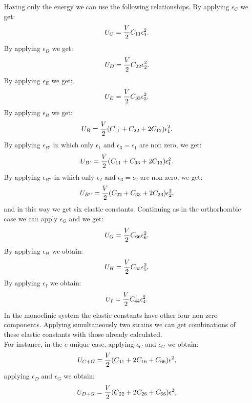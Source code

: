 \documentclass[12pt,a4paper]{article}
\begin{document}
Having only the energy we can use the following
relationships. By applying $\epsilon_C$ we get:
\begin{equation}
U_C= {V \over 2} C_{11} \epsilon_1^2.
\end{equation}
By applying $\epsilon_D$ we get:
\begin{equation}
U_D= {V \over 2} C_{22} \epsilon_2^2.
\end{equation}
By applying $\epsilon_E$ we get:
\begin{equation}
U_E= {V \over 2} C_{33} \epsilon_3^2.
\end{equation}
By applying $\epsilon_B$ we get:
\begin{equation}
U_B= {V \over 2} (C_{11} + C_{22} + 2 C_{12}) \epsilon_1^2.
\end{equation}
By applying $\epsilon_{B'}$ in which only $\epsilon_1$ and
$\epsilon_3=\epsilon_1$ are non zero, we get:
\begin{equation}
U_{B'}= {V \over 2} (C_{11} + C_{33} + 2 C_{13}) \epsilon_1^2.
\end{equation}
By applying $\epsilon_{B''}$ in which only $\epsilon_2$ and
$\epsilon_3=\epsilon_2$ are non zero, we get:
\begin{equation}
U_{B''}= {V \over 2} (C_{22} + C_{33} + 2 C_{23}) \epsilon_2^2,
\end{equation}
and in this way we get six elastic constants. Continuing as in the
orthorhombic case we can
apply $\epsilon_G$ and we get:
\begin{equation}
U_G= {V \over 2} C_{66} \epsilon_6^2.
\end{equation}
By applying $\epsilon_H$ we obtain:
\begin{equation}
U_H= {V \over 2} C_{55} \epsilon_5^2.
\end{equation}
By applying $\epsilon_I$ we obtain:
\begin{equation}
U_I= {V \over 2} C_{44} \epsilon_4^2.
\end{equation}
In the monoclinic system the elastic constants have other four non zero 
components.
Applying simultaneously two strains we can get combinations of these 
elastic constants with those already calculated. \\
For instance, in the $c$-unique case, applying $\epsilon_C$ and 
$\epsilon_G$ we obtain:
\begin{equation}
U_{C+G}= {V \over 2} (C_{11}+2 C_{16} + C_{66}) \epsilon^2,
\end{equation}
applying $\epsilon_D$ and $\epsilon_G$ we obtain:
\begin{equation}
U_{D+G}= {V \over 2} (C_{22}+2 C_{26} + C_{66}) \epsilon^2,
\end{equation}
\end{document}
